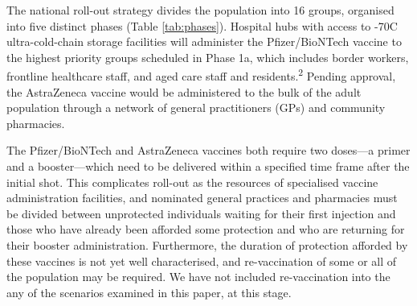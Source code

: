 \documentclass{article}
\begin{document}
The national roll-out strategy divides the population into 16 groups,
organised into five distinct phases (Table \ref{tab:phases}). Hospital
hubs with access to -70\degree C ultra-cold-chain storage facilities
will administer the Pfizer/BioNTech vaccine to the highest priority
groups scheduled in Phase 1a, which includes border workers, frontline
healthcare staff, and aged care staff and residents.\textsuperscript{2}
Pending approval, the AstraZeneca vaccine would be administered to the
bulk of the adult population through a network of general practitioners
(GPs) and community pharmacies.

The Pfizer/BioNTech and AstraZeneca vaccines both require two doses---a
primer and a booster---which need to be delivered within a specified
time frame after the initial shot. This complicates roll-out as the
resources of specialised vaccine administration facilities, and
nominated general practices and pharmacies must be divided between
unprotected individuals waiting for their first injection and those who
have already been afforded some protection and who are returning for
their booster administration. Furthermore, the duration of protection
afforded by these vaccines is not yet well characterised, and
re-vaccination of some or all of the population may be required. We have
not included re-vaccination into the any of the scenarios examined in
this paper, at this stage.
\end{document}
